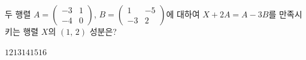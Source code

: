 두 행렬 $A=\begin{pmatrix} -3 & 1 \\ -4 & 0 \end{pmatrix}$, $B=\begin{pmatrix} 1 & -5 \\ -3 & 2 \end{pmatrix}$에 대하여 $X+2A=A-3B$를 만족시키는 행렬 $X$의 $(1,\,2)$ 성분은?
\begin{choices32}{$12$}{$13$}{$14$}{$15$}{$16$}\end{choices32}
